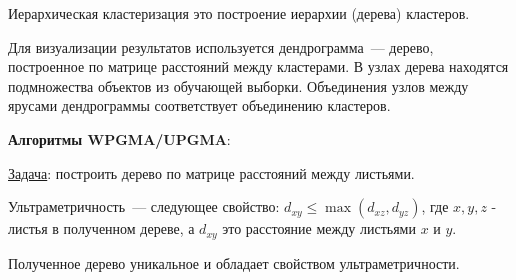 
\begin{definition}
  Иерархическая кластеризация это построение иерархии (дерева) кластеров.
\end{definition}

Для визуализации результатов используется дендрограмма~--- дерево, построенное
по матрице расстояний между кластерами. В узлах дерева находятся подмножества
объектов из обучающей выборки. Объединения узлов между ярусами дендрограммы
соответствует объединению кластеров.

\textbf{Алгоритмы WPGMA/UPGMA}:

\underline{Задача}: построить дерево по матрице расстояний между листьями.

\begin{definition}
  Ультраметричность~--- следующее свойство: \(d_{xy} \le \max(d_{xz}, d_{yz})\),
  где \(x, y, z\) - листья в полученном дереве, а \(d_{xy}\) это расстояние
  между листьями \(x\) и \(y\).
\end{definition}

\begin{remark}
  Полученное дерево уникальное и обладает свойством ультраметричности.
\end{remark}

